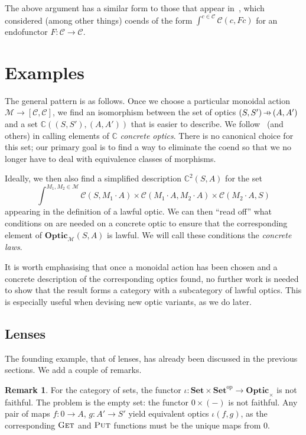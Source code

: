 \documentclass[11pt,letterpaper]{article}
\theoremstyle{plain}
\theoremstyle{definition}
\newtheorem{remark}[theorem]{Remark}
\newcommand{\C}{\mathscr{C}}
\newcommand{\M}{\mathscr{M}}
\newcommand{\Set}{\mathbf{Set}}
\newcommand{\Optic}{\mathbf{Optic}}
\newcommand{\conc}{\mathbb{C}}
\newcommand{\conctwice}{\mathbb{C}^2}
\newcommand{\op}{\mathrm{op}}
\newcommand{\act}{\cdot}
\newcommand{\fget}{\textsc{Get}}
\newcommand{\fput}{\textsc{Put}}
\newcommand{\hto}{\ensuremath{\,\mathaccent\shortmid\rightarrow\,}}
\begin{document}
The above argument has a similar form to those that appear in~\cite{OnTheTrace}, which considered (among other things) coends of the form $\int^{c \in \C} \C(c, Fc)$ for an endofunctor $F : \C \to \C$.

\section{Examples}\label{sec:examples}

The general pattern is as follows. Once we choose a particular monoidal action $\M \to [\C, \C]$, we find an isomorphism between the set of optics $(S, S') \hto (A, A')$ and a set $\conc((S, S'), (A, A'))$ that is easier to describe. We follow~\cite{ProfunctorOptics} (and others) in calling elements of $\conc$ \emph{concrete optics}. There is no canonical choice for this set; our primary goal is to find a way to eliminate the coend so that we no longer have to deal with equivalence classes of morphisms.

Ideally, we then also find a simplified description $\conctwice(S, A)$ for the set \[ \int^{M_1, M_2 \in \M} \C(S, M_1 \act A) \times \C(M_1 \act A, M_2 \act A) \times \C(M_2 \act A, S)\] appearing in the definition of a lawful optic. We can then ``read off'' what conditions on are needed on a concrete optic to ensure that the corresponding element of $\Optic_\M(S, A)$ is lawful. We will call these conditions the \emph{concrete laws}.

It is worth emphasising that once a monoidal action has been chosen and a concrete description of the corresponding optics found, no further work is needed to show that the result forms a category with a subcategory of lawful optics. This is especially useful when devising new optic variants, as we do later.

\subsection{Lenses}

The founding example, that of lenses, has already been discussed in the previous sections. We add a couple of remarks.

\begin{remark}\label{lens-iota-not-faithful}
  For the category of sets, the functor $\iota : \Set \times \Set^\op \to \Optic_\times$ is not faithful. The problem is the empty set: the functor $0 \times (-)$ is not faithful. Any pair of maps $f : 0 \to A$, $g : A' \to S'$ yield equivalent optics $\iota(f, g)$, as the corresponding $\fget$ and $\fput$ functions must be the unique maps from $0$.
\end{remark}
\end{document}
